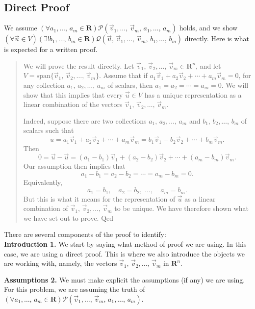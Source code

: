 \documentclass[a4paper,11pt]{article}
\newcommand{\R}{\mathbf{R}}
\newcommand{\PP}{\mathscr{P}}
\newcommand{\QQ}{\mathscr{Q}}
\begin{document}
\subsection*{Direct Proof}

We assume $(\forall a_1,\dots,\,a_m \in \R)\PP(\vec v_1,\dots,\,\vec
v_m,\,a_1,\dots,\,a_m)$ holds, and we show $(\forall\vec u \in
V)(\exists!b_1,\dots,\,b_m \in \R)\QQ(\vec u,\,\vec v_1,\dots,\,\vec
v_m,\,b_1,\dots,\,b_m)$ directly. Here is what is expected for a written proof. 

\begin{quotation}
  We will prove the result directly. Let $\vec v_1,\,\vec v_2,\dots,\,\vec v_m
  \in \R^n$, and let $V=\text{span}\{\vec v_1,\,\vec v_2,\dots,\,\vec v_m\}$.
  Assume that if $a_1\vec v_1 + a_2\vec v_2 + \cdots + a_m\vec v_m = 0$, for any
  collection $a_1,\,a_2,\dots,\,a_m$ of scalars, then $a_1=a_2=\cdots=a_m=0$. We
  will show that this implies that every $\vec u \in V$ has a unique
  representation as a linear combination of the vectors $\vec v_1,\,\vec
  v_2,\dots,\,\vec v_m$.

  Indeed, suppose there are two collections $a_1,\,a_2,\dots,\,a_m$ and
  $b_1,\,b_2,\dots,\,b_m$ of scalars such that
  \[
    u = a_1\vec v_1 + a_2\vec v_2 + \cdots + a_m\vec v_m =
    b_1\vec v_1 + b_2\vec v_2 + \cdots + b_m\vec v_m.
  \]
  Then
  \[
    0 = \vec u-\vec u =
    (a_1-b_1)\vec v_1 + (a_2-b_2)\vec v_2 + \cdots + (a_m-b_m)\vec v_m.
  \]
  Our assumption then implies that
  \[
    a_1-b_1=a_2-b_2=\cdots=a_m-b_m=0.
  \]
  Equivalently,
  \[
    a_1=b_1, \quad a_2=b_2,\;\dots,\quad a_m=b_m.
  \]
  But this is what it means for the representation of $\vec u$ as a linear
  combination of $\vec v_1,\,\vec v_2,\dots,\,\vec v_m$ to be unique. We have
  therefore shown what we have set out to prove.
  \hfill{\sc Qed}
\end{quotation}

There are several components of the proof to identify: \\

{\bf Introduction 1.} We start by saying what method of proof we are using. In
this case, we are using a direct proof. This is where we also introduce the
objects we are working with, namely, the vectors $\vec v_1,\,\vec
v_2,\dots,\,\vec v_m$ in $\R^n$.

{\bf Assumptions 2.} We must make explicit the assumptions (if any) we are
using. For this problem, we are assuming the truth of $(\forall a_1,\dots,\,a_m
\in \R)\PP(\vec v_1,\dots,\,\vec v_m,\,a_1,\dots,\,a_m)$.
\end{document}
